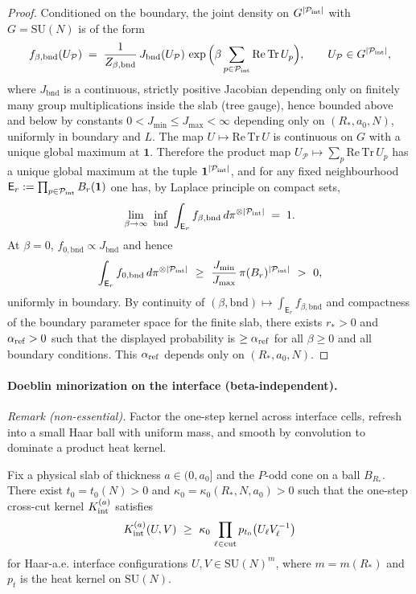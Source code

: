 \documentclass[11pt]{amsart}
\begin{document}
\begin{proof}
Conditioned on the boundary, the joint density on $G^{|\mathcal P_{\rm int}|}$ with $G=\mathrm{SU}(N)$ is of the form
\[
  f_{\beta,\mathrm{bnd}}(U_{\mathcal P})\;=\;\frac{1}{Z_{\beta,\mathrm{bnd}}}\,J_{\mathrm{bnd}}(U_{\mathcal P})\,\exp\Big(\beta\sum_{p\in\mathcal P_{\rm int}} \mathrm{Re\,Tr}\,U_p\Big),\qquad U_{\mathcal P}\in G^{|\mathcal P_{\rm int}|},
\]
where $J_{\mathrm{bnd}}$ is a continuous, strictly positive Jacobian depending only on finitely many group multiplications inside the slab (tree gauge), hence bounded above and below by constants $0<J_{\min}\le J_{\max}<\infty$ depending only on $(R_*,a_0,N)$, uniformly in boundary and $L$. The map $U\mapsto \mathrm{Re\,Tr}\,U$ is continuous on $G$ with a unique global maximum at $\mathbf 1$. Therefore the product map $U_{\mathcal P}\mapsto \sum_{p}\mathrm{Re\,Tr}\,U_p$ has a unique global maximum at the tuple $\mathbf 1^{|\mathcal P_{\rm int}|}$, and for any fixed neighbourhood $\mathsf E_{r}:=\prod_{p\in\mathcal P_{\rm int}} B_r(\mathbf 1)$ one has, by Laplace principle on compact sets,
\[
  \lim_{\beta\to\infty}\ \inf_{\mathrm{bnd}}\ \int_{\mathsf E_r} f_{\beta,\mathrm{bnd}}\,d\pi^{\otimes |\mathcal P_{\rm int}|}\;=\;1.
\]
At $\beta=0$, $f_{0,\mathrm{bnd}}\propto J_{\mathrm{bnd}}$ and hence
\[
  \int_{\mathsf E_r} f_{0,\mathrm{bnd}}\,d\pi^{\otimes |\mathcal P_{\rm int}|}\ \ge\ \frac{J_{\min}}{J_{\max}}\,\pi(B_r)^{|\mathcal P_{\rm int}|}\ >\ 0,
\]
uniformly in boundary. By continuity of $(\beta,\mathrm{bnd})\mapsto \int_{\mathsf E_r} f_{\beta,\mathrm{bnd}}$ and compactness of the boundary parameter space for the finite slab, there exists $r_*>0$ and $\alpha_{\rm ref}>0$ such that the displayed probability is $\ge \alpha_{\rm ref}$ for all $\beta\ge 0$ and all boundary conditions. This $\alpha_{\rm ref}$ depends only on $(R_*,a_0,N)$.
\end{proof}

\paragraph{Doeblin minorization on the interface (beta-independent).} \emph{Remark (non-essential).} Factor the one-step kernel across interface cells, refresh into a small Haar ball with uniform mass, and smooth by convolution to dominate a product heat kernel.
\begin{proposition}\label{prop:doeblin-interface}
Fix a physical slab of thickness $a\in(0,a_0]$ and the $P$-odd cone on a ball $B_{R_*}$. There exist $t_0=t_0(N)>0$ and $\kappa_0=\kappa_0(R_*,N,a_0)>0$ such that the one-step cross-cut kernel $K_{\rm int}^{(a)}$ satisfies
\[
  K_{\rm int}^{(a)}(U,V)\ \ge\ \kappa_0\,\prod_{\ell\in\mathrm{cut}} p_{t_0}\big(U_\ell V_\ell^{-1}\big)
\]
for Haar-a.e. interface configurations $U,V\in \mathrm{SU}(N)^{m}$, where $m=m(R_*)$ and $p_{t}$ is the heat kernel on $\mathrm{SU}(N)$.
\end{proposition}
\end{document}
